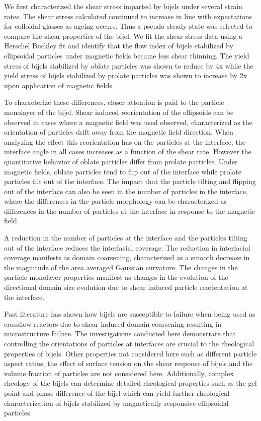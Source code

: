 We first characterized the shear stress imparted by bijels under several strain rates. The shear stress calculated continued to increase in line with expectations
for colloidal glasses as ageing occurs. Thus a pseudo-steady state was selected to compare the shear properties of the bijel.
We fit the shear stress data using a Herschel Buckley fit and identify that the flow index of bijels stabilized by ellipsoidal 
particles under magnetic fields became less shear thinning. The yield stress of bijels stabilized by oblate particles was shown to reduce by 4x while the yield stress
of bijels stabilized by prolate particles was shown to increase by 2x upon application of magnetic fields.

To characterize these differences, closer attention is paid to the particle monolayer of the bijel. Shear induced reorientation of the ellipsoids can be observed in cases
where a magnetic field was used observed, characterized as the orientation of particles drift away from the magnetic field direction. When analyzing the effect this reorientation
has on the particles at the interface, the interface angle in all cases increases as a function of the shear rate. However the quantitative behavior of oblate particles differ
from prolate particles. Under magnetic fields, oblate particles tend to flip out of the interface while prolate particles tilt out of the interface. The impact that
the particle tilting and flipping out of the interface can also be seen in the number of particles in the interface, where the differences in the particle morphology 
can be characterized as differences in the number of particles at the interface in response to the magnetic field. 

A reduction in the number of particles at the interface and the particles tilting out of the interface reduces the interfacial coverage. The reduction in interfacial
coverage manifests as domain coarsening, characterized as a smooth decrease in the magnitude of the area averaged Gaussian curvature. The changes in the particle monolayer
properties manifest as changes in the evolution of the directional domain size evolution due to shear induced particle reorientation at the interface. 

Past literature
has shown how bijels are susceptible to failure when being used as crossflow reactors due to shear induced domain coarsening resulting in microstructure failure. 
\cite{boakye-ansah_controlling_2020} The investigations conducted here demonstrate that controlling the orientations of particles at interfaces are crucial to 
the rheological properties of bijels. Other properties not considered here such as different particle aspect ratios, the effect of surface tension on the shear response of
bijels and the volume fraction of particles are not considered here. Additionally, complex rheology of the bijels can determine detailed rheological properties such as the
gel point and phase difference of the bijel which can yield further rheological characterization of bijels stabilized by magnetically responsive ellipsoidal particles.